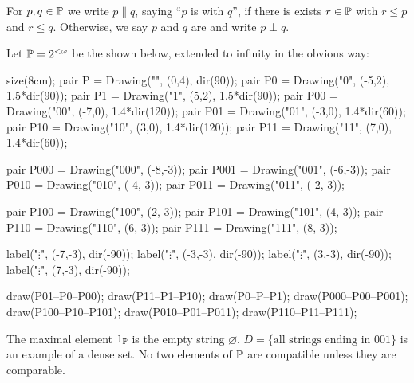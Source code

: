 \begin{definition}
	For $p,q \in \mathbb P$ we write $p \parallel q$,
	saying ``$p$ is  with $q$'',
	if there is exists $r \in \mathbb P$ with $r \le p$ and $r \le q$.
	Otherwise, we say $p$ and $q$ are 
	and write $p \perp q$.
\end{definition}
\begin{example}
	Let $\mathbb P = 2^{<\omega}$ be the  shown below,
	extended to infinity in the obvious way:
	\begin{center}
		\begin{asy}
			size(8cm);
			pair P = Drawing("\varnothing", (0,4), dir(90));
			pair P0 = Drawing("0", (-5,2), 1.5*dir(90));
			pair P1 = Drawing("1", (5,2),  1.5*dir(90));
			pair P00 = Drawing("00", (-7,0), 1.4*dir(120));
			pair P01 = Drawing("01", (-3,0), 1.4*dir(60));
			pair P10 = Drawing("10", (3,0),  1.4*dir(120));
			pair P11 = Drawing("11", (7,0),  1.4*dir(60));

			pair P000 = Drawing("000", (-8,-3));
			pair P001 = Drawing("001", (-6,-3));
			pair P010 = Drawing("010", (-4,-3));
			pair P011 = Drawing("011", (-2,-3));

			pair P100 = Drawing("100", (2,-3));
			pair P101 = Drawing("101", (4,-3));
			pair P110 = Drawing("110", (6,-3));
			pair P111 = Drawing("111", (8,-3));

			label("$\vdots$", (-7,-3), dir(-90));
			label("$\vdots$", (-3,-3), dir(-90));
			label("$\vdots$", (3,-3), dir(-90));
			label("$\vdots$", (7,-3), dir(-90));

			draw(P01--P0--P00);
			draw(P11--P1--P10);
			draw(P0--P--P1);
			draw(P000--P00--P001);
			draw(P100--P10--P101);
			draw(P010--P01--P011);
			draw(P110--P11--P111);
		\end{asy}
	\end{center}

	\begin{enumerate}[(a)]
		\ii The maximal element $1_\mathbb P$ is the empty string $\varnothing$.
		\ii $D = \{\text{all strings ending in $001$}\}$ is an example of a dense set.
		\ii No two elements of $\mathbb P$ are compatible unless they are comparable.
	\end{enumerate}
\end{example}


